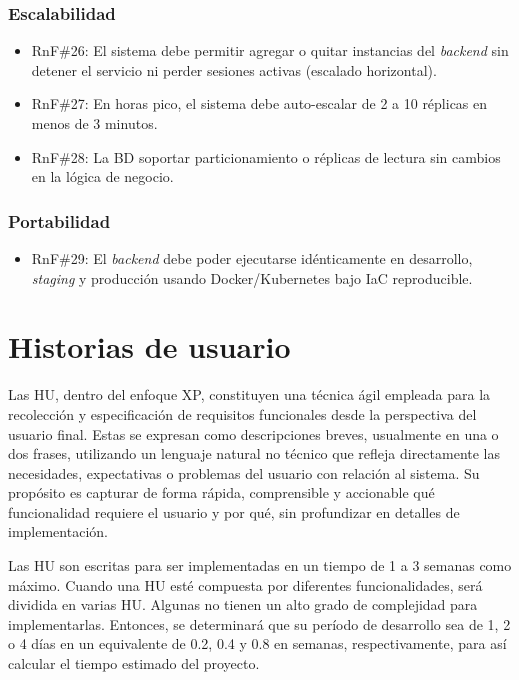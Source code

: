 \subsubsection{Escalabilidad}

\begin{itemize}
	\item \ac{RnF}\#26: El sistema debe permitir agregar o quitar instancias del \textit{backend} sin detener el servicio ni perder sesiones activas (escalado horizontal).
	\item \ac{RnF}\#27: En horas pico, el sistema debe auto-escalar de 2 a 10 réplicas en menos de 3 minutos.
	\item \ac{RnF}\#28: La \ac{BD} soportar particionamiento o réplicas de lectura sin cambios en la lógica de negocio.
\end{itemize}

\subsubsection{Portabilidad}

\begin{itemize}
	\item \ac{RnF}\#29: El \textit{backend} debe poder ejecutarse idénticamente en desarrollo, \textit{staging} y producción usando Docker/Kubernetes bajo \ac{IaC} reproducible.
\end{itemize}


\section{Historias de usuario}

Las \ac{HU}, dentro del enfoque \ac{XP}, constituyen una técnica ágil empleada para la recolección y especificación 
de requisitos funcionales desde la perspectiva del usuario final. Estas se expresan como descripciones
breves, usualmente en una o dos frases, utilizando un lenguaje natural no técnico que refleja directamente
las necesidades, expectativas o problemas del usuario con relación al sistema. Su propósito es capturar de
forma rápida, comprensible y accionable qué funcionalidad requiere el usuario y por qué, sin profundizar en
detalles de implementación. \citep{menzinsky2018historias}

Las \ac{HU} son escritas para ser implementadas en un tiempo de 1 a 3 semanas como máximo. Cuando una
\ac{HU} esté compuesta por diferentes funcionalidades, será dividida en varias \ac{HU}. Algunas no tienen un alto
grado de complejidad para implementarlas. Entonces, se determinará que su período de desarrollo sea de
1, 2 o 4 días en un equivalente de 0.2, 0.4 y 0.8 en semanas, respectivamente, para así calcular el tiempo
estimado del proyecto. \citep{beck2000extreme}

